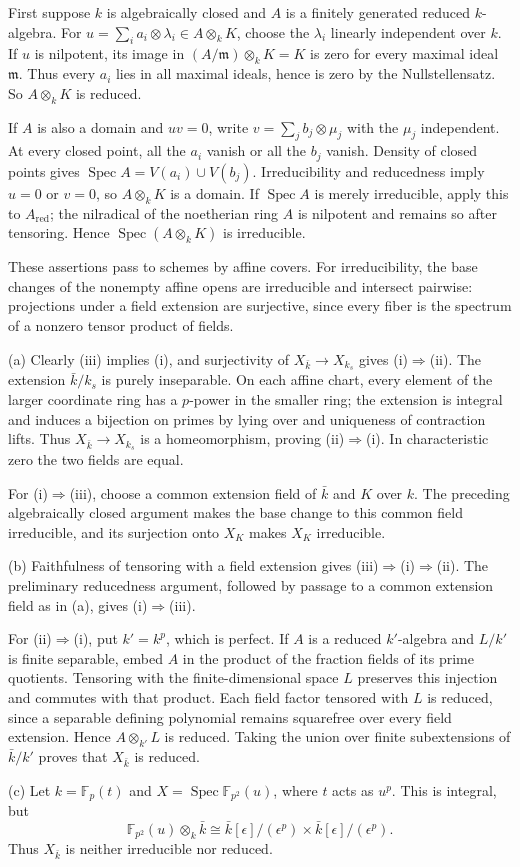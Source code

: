 First suppose $k$ is algebraically closed and $A$ is a finitely generated reduced $k$-algebra. For $u=\sum_i a_i\otimes\lambda_i\in A\otimes_kK$, choose the $\lambda_i$ linearly independent over $k$. If $u$ is nilpotent, its image in $(A/\mathfrak m)\otimes_kK=K$ is zero for every maximal ideal $\mathfrak m$. Thus every $a_i$ lies in all maximal ideals, hence is zero by the Nullstellensatz. So $A\otimes_kK$ is reduced.

If $A$ is also a domain and $uv=0$, write $v=\sum_jb_j\otimes\mu_j$ with the $\mu_j$ independent. At every closed point, all the $a_i$ vanish or all the $b_j$ vanish. Density of closed points gives $\operatorname{Spec}A=V(a_i)\cup V(b_j)$. Irreducibility and reducedness imply $u=0$ or $v=0$, so $A\otimes_kK$ is a domain. If $\operatorname{Spec}A$ is merely irreducible, apply this to $A_{\mathrm{red}}$; the nilradical of the noetherian ring $A$ is nilpotent and remains so after tensoring. Hence $\operatorname{Spec}(A\otimes_kK)$ is irreducible.

These assertions pass to schemes by affine covers. For irreducibility, the base changes of the nonempty affine opens are irreducible and intersect pairwise: projections under a field extension are surjective, since every fiber is the spectrum of a nonzero tensor product of fields.

(a) Clearly (iii) implies (i), and surjectivity of $X_{\bar k}\to X_{k_s}$ gives (i)$\Rightarrow$(ii). The extension $\bar k/k_s$ is purely inseparable. On each affine chart, every element of the larger coordinate ring has a $p$-power in the smaller ring; the extension is integral and induces a bijection on primes by lying over and uniqueness of contraction lifts. Thus $X_{\bar k}\to X_{k_s}$ is a homeomorphism, proving (ii)$\Rightarrow$(i). In characteristic zero the two fields are equal.

For (i)$\Rightarrow$(iii), choose a common extension field of $\bar k$ and $K$ over $k$. The preceding algebraically closed argument makes the base change to this common field irreducible, and its surjection onto $X_K$ makes $X_K$ irreducible.

(b) Faithfulness of tensoring with a field extension gives (iii)$\Rightarrow$(i)$\Rightarrow$(ii). The preliminary reducedness argument, followed by passage to a common extension field as in (a), gives (i)$\Rightarrow$(iii).

For (ii)$\Rightarrow$(i), put $k'=k^p$, which is perfect. If $A$ is a reduced $k'$-algebra and $L/k'$ is finite separable, embed $A$ in the product of the fraction fields of its prime quotients. Tensoring with the finite-dimensional space $L$ preserves this injection and commutes with that product. Each field factor tensored with $L$ is reduced, since a separable defining polynomial remains squarefree over every field extension. Hence $A\otimes_{k'}L$ is reduced. Taking the union over finite subextensions of $\bar k/k'$ proves that $X_{\bar k}$ is reduced.

(c) Let $k=\mathbb F_p(t)$ and $X=\operatorname{Spec}\mathbb F_{p^2}(u)$, where $t$ acts as $u^p$. This is integral, but
\[\mathbb F_{p^2}(u)\otimes_k\bar k\cong\bar k[\epsilon]/(\epsilon^p)\times\bar k[\epsilon]/(\epsilon^p).\]
Thus $X_{\bar k}$ is neither irreducible nor reduced.
